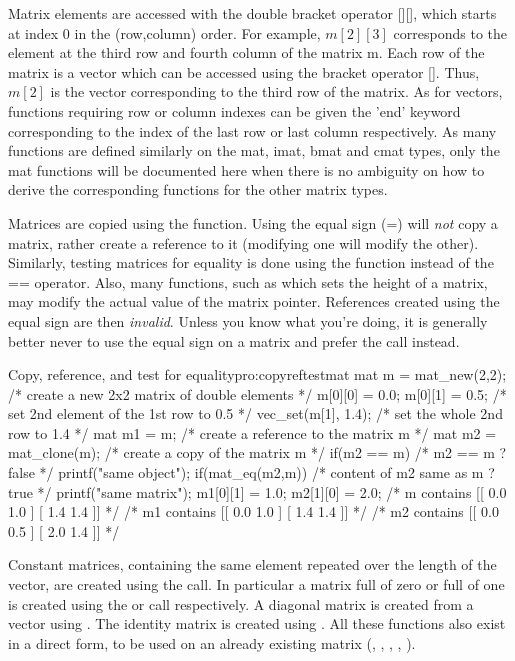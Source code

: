 Matrix elements are accessed with the double bracket operator
    [][], which starts at index $0$ in the (row,column) order. For example, $m[2][3]$
    corresponds to the element at the third row and fourth column of
    the matrix m. Each row of the matrix is a vector which can be
    accessed using the bracket operator []. Thus, $m[2]$ is the vector
    corresponding to the third row of the matrix. As for vectors,
    functions requiring row or column indexes can be given the 'end'
    keyword corresponding to the index of the last row or last column
    respectively. As many functions are defined similarly on the mat,
    imat, bmat and cmat types, only the mat functions will be
    documented here when there is no ambiguity on how to derive the
    corresponding functions for the other matrix types.  

  Matrices are copied using the  function. Using the
    equal sign (=) will \emph{not} copy a matrix, rather
    create a reference to it (modifying one will modify the
    other). Similarly, testing matrices for equality is done using the
     function instead of the
    == operator.  Also, many functions, such as  which sets
    the height of a matrix, may modify the actual value of the matrix
    pointer. References created using the equal sign are then
    \emph{invalid}. Unless you know what you're doing,
    it is generally better never to use the equal sign on a matrix and
    prefer the  call
    instead. 

\begin{program}{Copy, reference, and test for equality}{pro:copyreftestmat}
mat m = mat_new(2,2);  /* create a new 2x2 matrix of double elements */
m[0][0] = 0.0;         
m[0][1] = 0.5;         /* set 2nd element of the 1st row to 0.5 */
vec_set(m[1], 1.4);    /* set the whole 2nd row to 1.4 */
mat m1 = m;            /* create a reference to the matrix m */
mat m2 = mat_clone(m); /* create a copy of the matrix m */
if(m2 == m)            /* m2 == m ? false */
  printf("same object\n");  
if(mat_eq(m2,m))       /* content of m2 same as m ? true */
  printf("same matrix\n");  
m1[0][1] = 1.0;
m2[1][0] = 2.0;
/* m contains [[ 0.0 1.0 ] [ 1.4 1.4 ]] */
/* m1 contains [[ 0.0 1.0 ] [ 1.4 1.4 ]] */
/* m2 contains [[ 0.0 0.5 ] [ 2.0 1.4 ]] */
\end{program} 

 Constant matrices, containing the same element repeated over the
    length of the vector, are created using the
     call. In particular a matrix full of
    zero or full of one is created using the
     or  call
    respectively. A diagonal matrix is created from a vector using
    . The identity matrix is created using
    . All these functions also exist in a
    direct form, to be used on an already existing matrix
    (, , ,
    , ).

